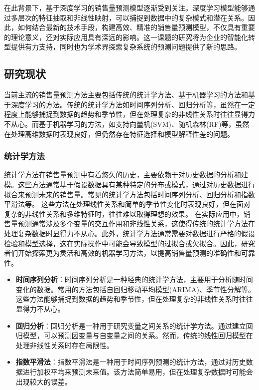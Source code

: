 \documentclass[12pt]{article}
\begin{document}
在此背景下，基于深度学习的销售量预测模型逐渐受到关注。深度学习模型能够通过多层次的特征抽取和非线性映射，可以捕捉到数据中的复杂模式和潜在关系。因此，如何结合最新的技术手段，构建高效、精准的销售量预测模型，不仅具有重要的理论意义，还对实际应用具有深远的影响。这一课题的研究将为企业的智能化转型提供有力支持，同时也为学术界探索复杂系统的预测问题提供了新的思路。

\subsection{研究现状}
当前主流的销售量预测方法主要包括传统的统计学方法、基于机器学习的方法和基于深度学习的方法。传统的统计学方法如时间序列分析、回归分析等，虽然在一定程度上能够捕捉到数据的趋势和季节性，但在处理复杂的非线性关系时往往显得力不从心。而基于机器学习的方法，如支持向量机(SVM)、随机森林(RF)等，虽然在处理高维数据时表现良好，但仍然存在特征选择和模型解释性差的问题。
\subsubsection{统计学方法}
统计学方法在销售量预测中有着悠久的历史，主要依赖于对历史数据的分析和建模。这些方法通常基于假设数据具有某种特定的分布或模式，通过对历史数据进行拟合来预测未来的销售量。常见的统计学方法包括时间序列分析、回归分析和指数平滑法等。
这些方法在处理线性关系和简单的季节性变化时表现良好，但在面对复杂的非线性关系和多维特征时，往往难以取得理想的效果。
在实际应用中，销售量预测通常涉及多个变量的交互作用和非线性关系，这使得传统的统计学方法在处理复杂数据时显得力不从心。此外，统计学方法通常需要对数据进行严格的假设检验和模型选择，这在实际操作中可能会导致模型的过拟合或欠拟合。因此，研究者们开始探索更为灵活和高效的机器学习方法，以提高销售量预测的准确性和可靠性。
\begin{itemize}
    \item \textbf{时间序列分析}：时间序列分析是一种经典的统计学方法，主要用于分析随时间变化的数据。常用的方法包括自回归移动平均模型(ARIMA)\cite{ARIMA}、季节性分解等。这些方法能够捕捉到数据的趋势和季节性，但在处理复杂的非线性关系时往往显得力不从心。
    \item \textbf{回归分析}：回归分析是一种用于研究变量之间关系的统计学方法。通过建立回归模型，可以预测因变量与自变量之间的关系\cite{TimeSeriesAnalysis}。然而，传统的线性回归模型在处理非线性关系时存在局限性。
    \item \textbf{指数平滑法}：指数平滑法是一种用于时间序列预测的统计方法，通过对历史数据进行加权平均来预测未来值。该方法简单易用，但在处理复杂数据时可能会出现较大的误差。
\end{itemize}
\end{document}
